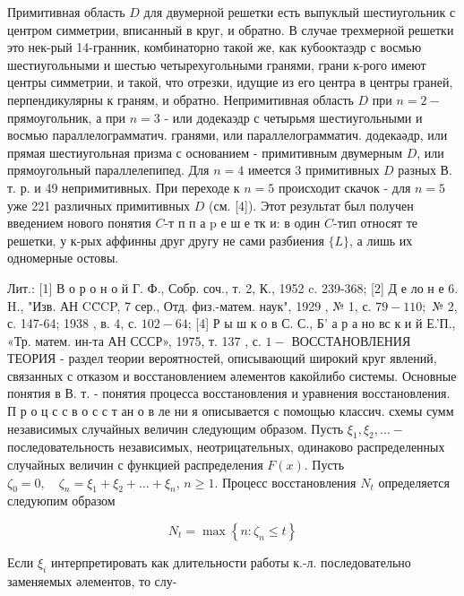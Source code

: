 \documentclass[10pt]{article}
\begin{document}
Примитивная область $D$ для двумерной решетки есть выпуклый шестиугольник с центром симметрии, вписанный в круг, и обратно. В случае трехмерной решетки это нек-рый 14-гранник, комбинаторно такой же, как кубооктаэдр с восмью шестиугольными и шестью четырехугольными гранями, грани к-рого имеют центры симметрии, и такой, что отрезки, идущие из его центра в центры граней, перпендикулярны к граням, и обратно. Непримитивная область $D$ при $n=2-$ прямоугольник, а при $n=3$ - или додекаэдр с четырьмя шестиугольными и восмью параллелограмматич. гранями, или параллелограмматич. додекаәдр, или прямая шестиугольная призма с основанием - примитивным двумерным $D$, или прямоугольный параллелепипед. Для $n=4$ имеется 3 примитивных $D$ разных В. т. р. и 49 непримитивных. При переходе к $n=5$ происходит скачок - для $n=5$ уже 221 различных примитивных $D$ (см. [4]). Этот результат был получен введением нового понятия $C$-т п п а p е ш е тк и: в один $C$-тип относят те решетки, у к-рых аффинны друг другу не сами разбиения $\{L\}$, а лишь их одномерные остовы.



Лит.: [1] В о р о н о й Г. Ф., Собр. соч., т. 2, К., 1952 c. 239-368; [2] Д е ло н е 6. H., "Изв. АН CC̈CP, 7 сер., Отд. физ.-матем. наук", 1929 , № 1, с. $79-110 ;$ № 2, с. 147-64; 1938 , в. 4, с. $102-64$; [4] Р ы ш к о в С. С., Б' а р а но вс к и й Е.'П., «Тр. матем. ин-та АН СССР», 1975, т. 137 , с. $1-$ ВОССТАНОВЛЕНИЯ ТЕОРИЯ - раздел теории вероятностей, описывающий широкий круг явлений, связанных с отказом и восстановлением әлементов какойлибо системы. Основные понятия в В. т. - понятия процесса восстановления и уравнения восстановления. П р о ц с с в о с с т ан о в ле ни я описывается с помощью классич. схемы сумм независимых случайных величин следующим образом. Пусть $\xi_{1}, \xi_{2}, \ldots-$ последовательность независимых, неотрицательных, одинаково распределенных случайных величин с функцией распределения $F(x)$. Пусть $\zeta_{0}=0, \quad \zeta_{n}=\xi_{1}+\xi_{2}+\ldots+\xi_{n}$, $n \geqslant 1$. Процесс восстановления $N_{t}$ определяется следуюпим образом



\[

N_{t}=\max \left\{n: \zeta_{n} \leqslant t\right\}

\]



Если $\xi_{i}$ интерпретировать как длительности работы к.-л. последовательно заменяемых әлементов, то слу-
\end{document}
